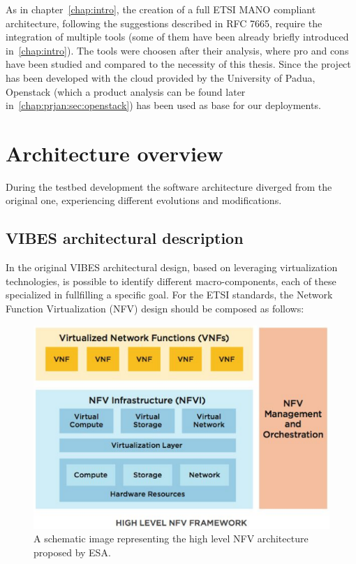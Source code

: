 \documentclass[10pt]{book}
\begin{document}
As in chapter~\ref{chap:intro}, the creation of a full ETSI MANO compliant
architecture, following the suggestions described in RFC 7665, require the
integration of multiple tools (some of them have been already briefly introduced
in~\ref{chap:intro}). The tools were choosen after their analysis, where pro and
cons have been studied and compared to the necessity of this thesis. Since the
project has been developed with the cloud provided by the University of Padua,
Openstack (which a product analysis can be found later
in~\ref{chap:prjan:sec:openstack}) has been used as base for our deployments.

\section{Architecture overview}

During the testbed development the software architecture diverged from the 
original one, experiencing different evolutions and modifications.

\subsection{VIBES architectural description}

In the original VIBES architectural design, based on leveraging virtualization 
technologies, is possible to identify different macro-components, each of these 
specialized in fullfilling a specific goal. For the ETSI standards, the Network 
Function Virtualization (NFV) design should be composed as follows:
\begin{figure}[t]
 \centering
 \includegraphics[scale=2]{etsi_arch}
 \caption{A schematic image representing the high level NFV architecture 
proposed by ESA.}
 \label{chap:prjan:img:etsi_arch}
\end{figure}
\end{document}
